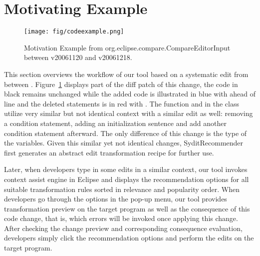 \section{Motivating Example}\label{sec:motivation}
\begin{figure}[ht]
\centering
\texttt{[image: fig/codeexample.png]}
\caption{Motivation Example from org.eclipse.compare.CompareEditorInput between v20061120 and v20061218. 
}
\label{fig:motivateExample}
\end{figure}

This section overviews the workflow of our tool based on a systematic edit  from    between  .  Figure~\ref{fig:motivateExample} displays part of the diff patch of this change, the code in black remains unchanged while the added code is illustrated in blue with   ahead of line and the deleted statements is in red with  . The function   and   in the class   utilize very similar but not identical context with a similar edit as well: removing a condition statement, adding an initialization sentence and add another condition statement afterward. The only difference of this change is the type of the variables. Given this similar yet not identical changes, SyditRecommender first generates an abstract edit transformation recipe for further use. %

Later, when developers type in some edits in a similar context, our tool invokes context assist engine in Eclipse and displays the recommendation options for all suitable transformation rules sorted in relevance and popularity order. When developers go through the options in the pop-up menu, our tool provides transformation preview on the target program as well as the consequence of this code change, that is, which errors will be invoked once applying this change. After checking the change preview and corresponding consequence evaluation, developers simply click the recommendation options and perform the edits on the target program.  

